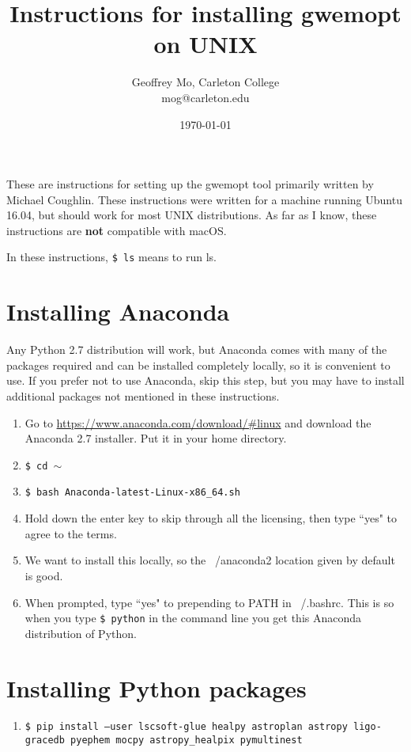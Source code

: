 \documentclass[11pt]{article}
\begin{document}
\title{Instructions for installing gwemopt on UNIX}
\date{\today}
\author{Geoffrey Mo, Carleton College\\mog@carleton.edu}

\maketitle

These are instructions for setting up the gwemopt tool primarily written by Michael Coughlin. These instructions were written for a machine running Ubuntu 16.04, but should work for most UNIX distributions. As far as I know, these instructions are {\bf not} compatible with macOS.

In these instructions, {\tt \$ ls} means to run ls.

\section{Installing Anaconda}
Any Python 2.7 distribution will work, but Anaconda comes with many of the packages required and can be installed completely locally, so it is convenient to use. If you prefer not to use Anaconda, skip this step, but you may have to install additional packages not mentioned in these instructions.

\begin{enumerate}
	\item Go to \url{https://www.anaconda.com/download/#linux} and download the Anaconda 2.7 installer. Put it in your home directory.
	\item {\tt \$ cd $\sim$} 
	\item {\tt \$ bash Anaconda-latest-Linux-x86\_64.sh}
	\item Hold down the enter key to skip through all the licensing, then type ``yes" to agree to the terms. 
	\item We want to install this locally, so the ~/anaconda2 location given by default is good.
	\item When prompted, type ``yes" to prepending to PATH in ~/.bashrc. This is so when you type {\tt \$ python} in the command line you get this Anaconda distribution of Python.
\end{enumerate}


\section{Installing Python packages}
\begin{enumerate}
	\item {\tt \$ pip install --user lscsoft-glue healpy astroplan astropy ligo-gracedb pyephem mocpy astropy\_healpix pymultinest}
\end{enumerate}
\end{document}
